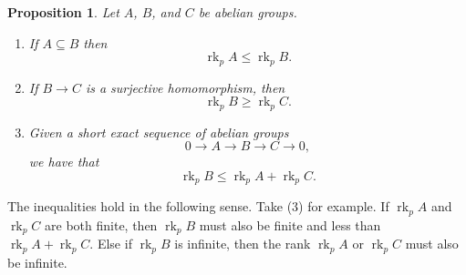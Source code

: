 \documentclass{amsart}
\numberwithin{equation}{section}
\theoremstyle{plain}
\newtheorem{proposition}[theorem]{Proposition}
\theoremstyle{definition}
\theoremstyle{remark}
\begin{document}
\begin{proposition}\label{prop: inequalities of p-rank}
    Let $A$, $B$, and $C$ be abelian groups.
	\begin{enumerate}
		\item If $A\subseteq B$ then
		\begin{equation*}
			\operatorname{rk}_pA\leq\operatorname{rk}_pB.
		\end{equation*}
		\item If $B\to C$ is a surjective homomorphism, then
		\begin{equation*}
			\operatorname{rk}_pB\geq\operatorname{rk}_pC.
		\end{equation*}
		\item Given a short exact sequence of abelian groups
		\begin{equation*}
			0\to A\to B\to C\to0,
		\end{equation*}
		we have that
		\begin{equation*}
			\operatorname{rk}_p B\leq\operatorname{rk}_p A+\operatorname{rk}_p C.
		\end{equation*}
	\end{enumerate}	
\end{proposition}
The inequalities hold in the following sense.
Take (3) for example.
If $\operatorname{rk}_pA$ and $\operatorname{rk}_pC$ are both finite, then $\operatorname{rk}_pB$ must also be finite and less than $\operatorname{rk}_pA+\operatorname{rk}_pC$.
Else if $\operatorname{rk}_pB$ is infinite, then the rank $\operatorname{rk}_pA$ or $\operatorname{rk}_pC$ must also be infinite.
\end{document}
